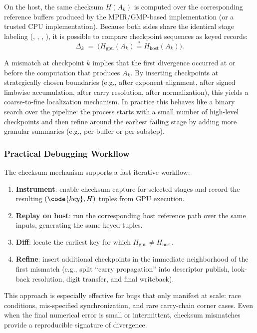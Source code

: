 On the host, the same checksum $H(A_k)$ is computed over the corresponding
reference buffers produced by the MPIR/GMP-based implementation (or a trusted
CPU implementation). Because both sides share the identical stage labeling
(, , , ), it is possible to
compare checkpoint sequences as keyed records:
\begin{equation}
  \Delta_k \;=\;
  \bigl(H_{\mathrm{gpu}}(A_k) \stackrel{?}{=} H_{\mathrm{host}}(A_k)\bigr).
\end{equation}

A mismatch at checkpoint $k$ implies that the first divergence occurred at or
before the computation that produces $A_k$. By inserting checkpoints at
strategically chosen boundaries (e.g., after exponent alignment, after signed
limbwise accumulation, after carry resolution, after normalization), this yields a
coarse-to-fine localization mechanism. In practice this behaves like a binary
search over the pipeline: the process starts with a small number of high-level checkpoints
and then refine around the earliest failing stage by adding more granular
summaries (e.g., per-buffer or per-substep).

\subsubsection{Practical Debugging Workflow}

The checksum mechanism supports a fast iterative workflow:
\begin{enumerate}
  \item \textbf{Instrument}: enable checksum capture for selected stages and
  record the resulting $(\code{key}, H)$ tuples from GPU execution.
  \item \textbf{Replay on host}: run the corresponding host reference path over
  the same inputs, generating the same keyed tuples.
  \item \textbf{Diff}: locate the earliest key for which
  $H_{\mathrm{gpu}} \ne H_{\mathrm{host}}$.
  \item \textbf{Refine}: insert additional checkpoints in the immediate
  neighborhood of the first mismatch (e.g., split ``carry propagation'' into
  descriptor publish, look-back resolution, digit transfer, and final writeback).
\end{enumerate}

This approach is especially effective for bugs that only manifest at scale:
race conditions, mis-specified synchronization, and rare carry-chain corner
cases. Even when the final numerical error is small or intermittent, checksum
mismatches provide a reproducible signature of divergence.

